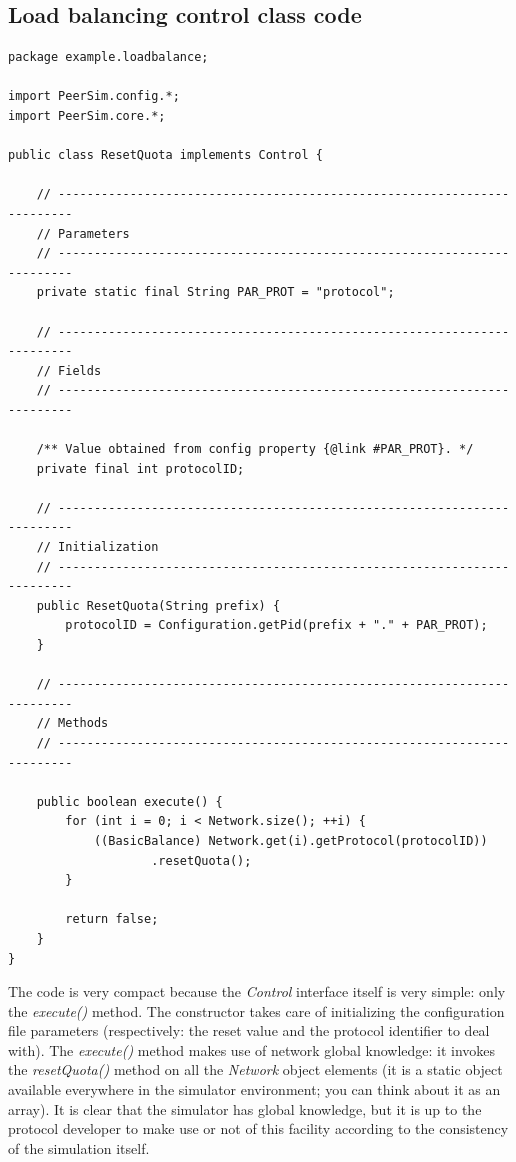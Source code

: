 \documentclass[a4paper,11pt]{article}
\begin{document}
\subsection{Load balancing control class code}

\footnotesize
\begin{verbatim}
package example.loadbalance;

import PeerSim.config.*;
import PeerSim.core.*;

public class ResetQuota implements Control {

    // ------------------------------------------------------------------------
    // Parameters
    // ------------------------------------------------------------------------
    private static final String PAR_PROT = "protocol";

    // ------------------------------------------------------------------------
    // Fields
    // ------------------------------------------------------------------------

    /** Value obtained from config property {@link #PAR_PROT}. */
    private final int protocolID;

    // ------------------------------------------------------------------------
    // Initialization
    // ------------------------------------------------------------------------
    public ResetQuota(String prefix) {
        protocolID = Configuration.getPid(prefix + "." + PAR_PROT);
    }

    // ------------------------------------------------------------------------
    // Methods
    // ------------------------------------------------------------------------

    public boolean execute() {
        for (int i = 0; i < Network.size(); ++i) {
            ((BasicBalance) Network.get(i).getProtocol(protocolID))
                    .resetQuota();
        }

        return false;
    }
}
\end{verbatim}
\normalsize

The code is very compact because the \emph{Control} interface itself
is very simple: only the \emph{execute()} method. The constructor takes
care of initializing the configuration file parameters (respectively:
the reset value and the protocol identifier to deal with). The \emph{execute()}
method makes use of network global knowledge: it invokes the \emph{resetQuota()}
method on all the \emph{Network} object elements (it is a static
object available everywhere in the simulator environment; you can think
about it as an array). It is clear that the simulator has global knowledge,
but it is up to the protocol developer to make use or not of this
facility according to the consistency of the simulation itself. 
\end{document}
